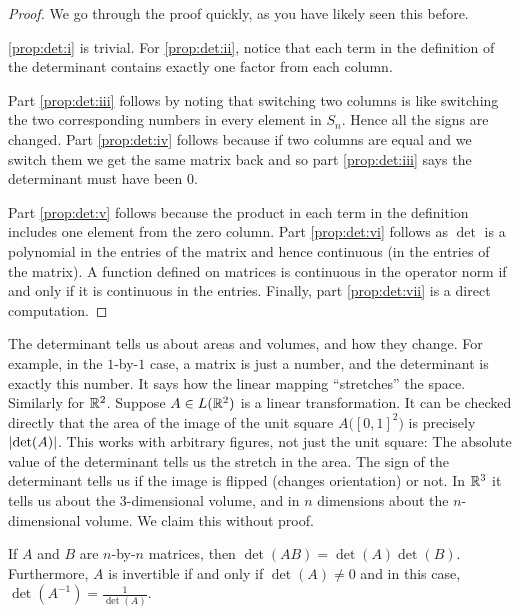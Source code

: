 \begin{proof}
We go through the proof quickly, as you have likely seen this before.

\ref{prop:det:i} is trivial.  For \ref{prop:det:ii}, notice that each term in the definition of the
determinant contains exactly one factor from each column.

Part \ref{prop:det:iii} follows by noting that switching two columns is like switching the
two corresponding numbers in every element in $S_n$.  Hence all the signs
are changed.
Part \ref{prop:det:iv} follows because if two columns are equal and we switch them we get
the same matrix back and so part \ref{prop:det:iii} says the determinant must have been
0.

Part \ref{prop:det:v} follows because the product in each term in the definition includes
one element from the zero column.
Part \ref{prop:det:vi} follows as $\det$ is a polynomial in the entries of the matrix
and hence continuous (in the entries of the matrix).  A function defined on
matrices is continuous in the operator norm if and only if it is 
continuous in the entries.
Finally, part \ref{prop:det:vii} is a direct computation.
\end{proof}

The determinant tells us about areas and volumes, and how they change.
For example, in the $1$-by-$1$ case, a matrix is just a number, and the
determinant is exactly this number.  It says how the linear mapping
``stretches'' the space.  Similarly for ${\mathbb{R}}^2$.
Suppose $A \in L({\mathbb{R}}^2)$ is a linear transformation.
It can be checked directly that
the area of the image of the unit square $A\bigl([0,1]^2\bigr)$ is precisely
$\lvert {\det(A)} \rvert$.
This works with arbitrary figures, not just the unit
square:
The absolute value of the determinant tells us the stretch in the area.
The sign of the determinant tells us if the image is
flipped (changes orientation) or not.
In ${\mathbb{R}}^3$ it
tells us about the 3-dimensional volume, and in $n$ dimensions about the
$n$-dimensional volume.  We claim this without proof.

\begin{prop}
If $A$ and $B$ are $n$-by-$n$ matrices, then $\det(AB) = \det(A)\det(B)$.
Furthermore, $A$ is invertible if and only if $\det(A) \not= 0$ and in
this case, $\det(A^{-1}) = \frac{1}{\det(A)}$.
\end{prop}

